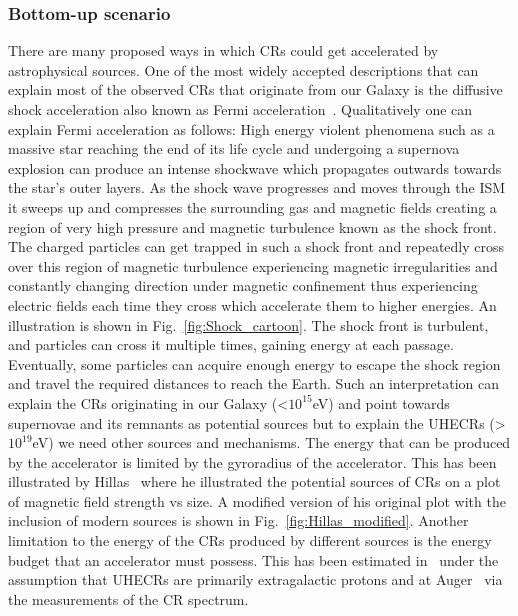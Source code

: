 \subsubsection{Bottom-up scenario}
\label{subsec:Bupsce}
There are many proposed ways in which \glspl{CR} could get accelerated by astrophysical sources. One of the most widely accepted descriptions that can explain most of the observed \glspl{CR} that originate from our Galaxy is the diffusive shock acceleration also known as Fermi acceleration~\cite{PhysRev.75.1169}. Qualitatively one can explain Fermi acceleration as follows: High energy violent phenomena such as a massive star reaching the end of its life cycle and undergoing a supernova explosion can produce an intense shockwave which propagates outwards towards the star's outer layers. As the shock wave progresses and moves through the \gls{ISM} it sweeps up and compresses the surrounding gas and magnetic fields creating a region of very high pressure and magnetic turbulence known as the shock front. The charged particles can get trapped in such a shock front and repeatedly cross over this region of magnetic turbulence experiencing magnetic irregularities and constantly changing direction under magnetic confinement thus experiencing electric fields each time they cross which accelerate them to higher energies. An illustration is shown in Fig.~\ref{fig:Shock_cartoon}. The shock front is turbulent, and particles can cross it multiple times, gaining energy at each passage. Eventually, some particles can acquire enough energy to escape the shock region and travel the required distances to reach the Earth. Such an interpretation can explain the \glspl{CR} originating in our Galaxy (<$10^{15}$eV) and point towards supernovae and its remnants as potential sources but to explain the \glspl{UHECR} (>$10^{19}$eV) we need other sources and mechanisms. The energy that can be produced by the accelerator is limited by the gyroradius of the accelerator. This has been illustrated by Hillas~\cite{1984ARA&A..22..425H} where he illustrated the potential sources of \glspl{CR} on a plot of magnetic field strength vs size. A modified version of his original plot with the inclusion of modern sources is shown in Fig.~\ref{fig:Hillas_modified}. Another limitation to the energy of the \glspl{CR} produced by different sources is the energy budget that an accelerator must possess. This has been estimated in~\cite{Murase:2008sa} under the assumption that \glspl{UHECR} are primarily extragalactic protons and at Auger~\cite{2018_auger_comp_spec} via the measurements of the CR spectrum. 

